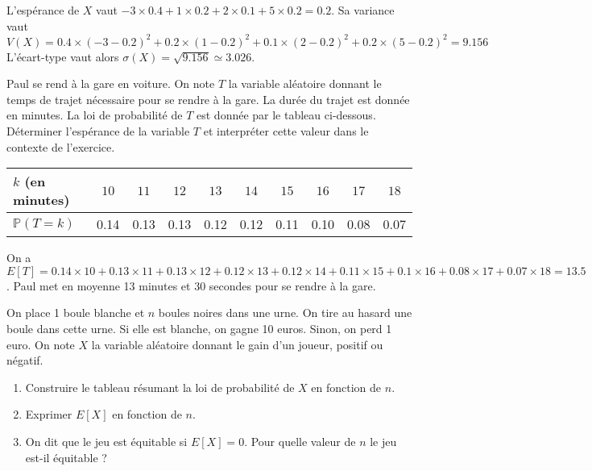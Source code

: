 \documentclass[11pt,fleqn, openany]{book} %
\begin{document}
\begin{solution}L'espérance de $X$ vaut $-3 \times 0.4+1 \times 0.2 + 2 \times 0.1 + 5 \times 0.2 = 0.2$. Sa variance vaut
\[V(X)=0.4 \times (-3-0.2)^2 + 0.2 \times (1-0.2)^2 + 0.1 \times (2-0.2)^2 + 0.2 \times (5-0.2)^2=9.156\]
L'écart-type vaut alors $\sigma(X)=\sqrt{9.156}\simeq 3.026$.\end{solution}




\begin{exercise}Paul se rend à la gare en voiture. On note $T$ la variable aléatoire donnant le temps de trajet nécessaire pour se rendre à la gare. La durée du trajet est donnée en minutes. La loi de probabilité de $T$ est donnée par le tableau ci-dessous. Déterminer l'espérance de la variable $T$ et interpréter cette valeur dans le contexte de l'exercice.


\begin{center}
\begin{tabular}{|l|c|c|c|c|c|c|c|c|c|}
\hline
$k$ (en minutes) & $10$ & $11$ & $12$ & $13$ &$14$&$15$&$16$&$17$&$18$ \\
\hline
$\mathbb{P}(T=k)$ & 0.14 & 0.13 & 0.13 & 0.12 & 0.12&0.11&0.10&0.08&0.07\\
\hline \end{tabular}
\end{center}\end{exercise}

\begin{solution}On a $E[T]=0.14 \times 10 + 0.13 \times 11 + 0.13 \times 12 + 0.12 \times 13 + 0.12 \times 14 + 0.11 \times 15 + 0.1 \times 16 + 0.08 \times 17 + 0.07 \times 18=13.5$. Paul met en moyenne 13 minutes et 30 secondes pour se rendre à la gare.\end{solution}




\begin{exercise}On place 1 boule blanche et $n$ boules noires dans une urne. On tire au hasard une boule dans cette urne. Si elle est blanche, on gagne 10 euros. Sinon, on perd 1 euro. On note $X$ la variable aléatoire donnant le gain d'un joueur, positif ou négatif.
\begin{enumerate}
\item Construire le tableau résumant la loi de probabilité de $X$ en fonction de $n$.
\item Exprimer $E[X]$ en fonction de $n$.
\item On dit que le jeu est équitable si $E[X]=0$. Pour quelle valeur de $n$ le jeu est-il équitable ?
\end{enumerate}\end{exercise}
\end{document}
